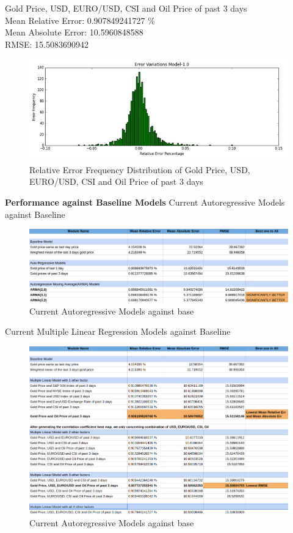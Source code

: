 \documentclass[runningheads]{llncs}
\begin{document}
\noindent Gold Price, USD, EURO/USD, CSI and Oil Price of past 3 days \\
Mean Relative Error: 0.907849241727 \% \\
Mean Absolute Error: 10.5960848588 \\
RMSE: 15.5083690942 \\
\begin{figure}
\centering
\includegraphics[width=\textwidth]{GoldUSDEuroCSIOil_Daily.png}
\caption{Relative Error Frequency Distribution of Gold Price, USD, EURO/USD, CSI and Oil Price of past 3 days}
\label{fig:GoldUSDEuroCSIOil_Daily.png}
\end{figure}

\noindent\textbf{Performance against Baseline Models}
Current Autoregressive Models against Baseline \\
\begin{figure}
\centering
\includegraphics[width=\textwidth]{GoldAutoAgainstBase_Daily.png}
\caption{Current Autoregressive Models against base}
\label{fig:GoldAutoAgainstBase_Daily.png}
\end{figure}

Current Multiple Linear Regression Models against Baseline \\
\begin{figure}
\centering
\includegraphics[width=\textwidth]{GoldMLRAgainstBase_Daily.png}
\caption{Current Autoregressive Models against base}
\label{fig:GoldMLRAgainstBase_Daily.png}
\end{figure}
\end{document}
